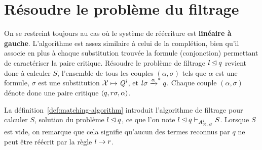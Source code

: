 

\section{Résoudre le problème du filtrage}
\label{sec:filtrage}

On se restreint toujours au cas où le système de réécriture est \textbf{linéaire à gauche}. 
L'algorithme est assez similaire à celui de la complétion, bien qu'il associe en plus à chaque substitution trouvée
la formule (conjonction) permettant de caractériser la paire critique. Résoudre le problème de filtrage $l \unlhd q$ revient donc à 
calculer $S$, l'ensemble de tous les couples $(\alpha, \sigma)$ 
tels que $\alpha$ est une formule, $\sigma$ est une substitution $\mathcal X \mapsto \mathit Q^i$, et $l\sigma \xrightarrow{\alpha}^* q$.
Chaque couple $(\alpha, \sigma)$ dénote donc une paire critique $\langle q,r\sigma,\alpha\rangle$.


La définition~\ref{def:matching-algorithm} introduit l'algorithme de filtrage pour calculer $S$, solution du problème $l \unlhd q$,
ce que l'on note $l \unlhd q \vdash_{{\mathit A}_{\mathcal R,E}^i} S$. Lorsque $S$ est vide, on remarque que cela signifie 
qu'aucun des termes reconnus par $q$ ne peut être réécrit par la règle $l \rightarrow r$.


